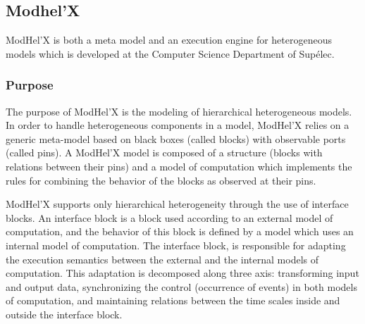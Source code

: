 \documentclass{gemoc} %
\begin{document}
\subsection{Modhel'X}
ModHel'X is both a meta model and an execution engine for heterogeneous models which is developed at the Computer Science Department of Sup\'elec.


\subsubsection{Purpose}
The purpose of ModHel'X is the modeling of hierarchical heterogeneous models. In order to handle heterogeneous components in a model, ModHel'X relies on a generic meta-model based on black boxes (called blocks) with observable ports (called pins). A ModHel'X model is composed of a structure (blocks with relations between their pins) and a model of computation which implements the rules for combining the behavior of the blocks as observed at their pins.

ModHel'X supports only hierarchical heterogeneity through the use of interface blocks. An interface block is a block used according to an external model of computation, and the behavior of this block is defined by a model which uses an internal model of computation. The interface block, is responsible for adapting the execution semantics between the external and the internal models of computation. This adaptation is decomposed along three axis: transforming input and output data, synchronizing the control (occurrence of events) in both models of computation, and maintaining relations between the time scales inside and outside the interface block.
\end{document}
